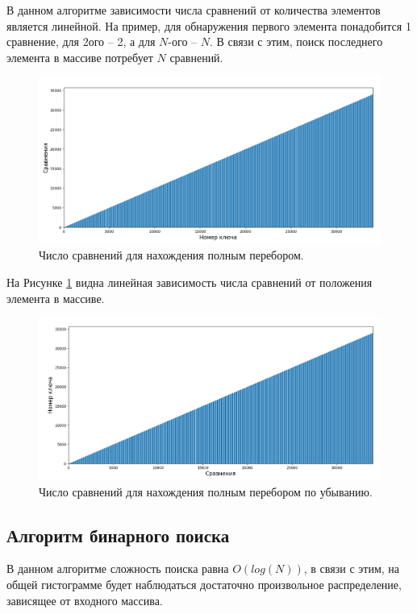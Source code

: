 \documentclass[12pt]{report}
\begin{document}
	В данном алгоритме зависимости числа сравнений от количества элементов является линейной. На пример, для обнаружения первого элемента понадобится 1 сравнение, для 2ого -- 2, а для $N$-ого -- $N$.  В связи с этим, поиск последнего элемента в массиве потребует $N$ сравнений. 
	
	\begin{figure}[H]
		\begin{center}
			\includegraphics[width=0.8\linewidth]{img/plunc_keys}
			\caption{Число сравнений для нахождения полным перебором.}
			\label{img:brute}
		\end{center}
	\end{figure}
	
	На Рисунке \ref{img:brute} видна линейная зависимость числа сравнений от положения элемента в массиве.
	
	\begin{figure}[H]
		\begin{center}
			\includegraphics[width=0.8\linewidth]{img/plunc_comp}
			\caption{Число сравнений для нахождения полным перебором по убыванию.}
			\label{img:brute_sorted}
		\end{center}
	\end{figure}
	
	\subsection{Алгоритм бинарного поиска}
	
	В данном алгоритме сложность поиска равна $O(log(N))$, в связи с этим, на общей гистограмме будет наблюдаться достаточно произвольное распределение, зависящее от входного массива.
	
\end{document}
